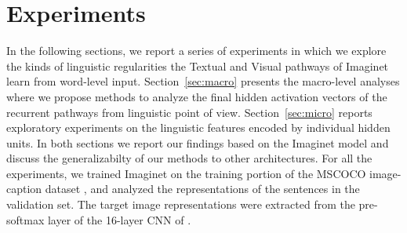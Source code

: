\section{Experiments}
\label{sec:experiments}


In the following sections, we report a series of experiments in which
we explore the kinds of linguistic regularities the
{\sc Textual} and {\sc Visual} pathways of {\sc Imaginet} learn from
word-level input. Section~\ref{sec:macro} presents the macro-level
analyses where we propose methods to analyze the final hidden activation 
vectors of the recurrent pathways from linguistic point of view. 
Section~\ref{sec:micro} reports exploratory experiments on
the linguistic features encoded by individual hidden units. 
In both sections we report our findings based on the {\sc Imaginet} model
and discuss the generalizabilty of our methods to other architectures.
\label{edit:experimentsgeneral}
For all the experiments, we trained {\sc Imaginet} on the training portion of the
MSCOCO image-caption dataset \cite{lin2014microsoft}, and analyzed the
representations of the sentences in the validation set. The target
image representations were extracted from the pre-softmax layer of the
16-layer CNN of .  






